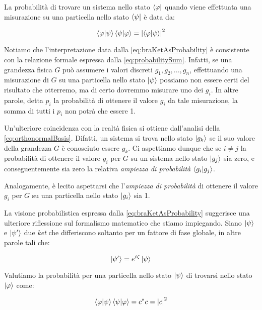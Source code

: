 La probabilità di trovare un sistema nello stato $\bra{\varphi}$ quando viene effettuata una misurazione su una particella nello stato $\bra{\psi}$ \`e data da:

	\begin{equation} \label{eq:braKetAsProbability}
		\braket{\varphi}{\psi} \braket{\psi}{\varphi} = \left | \braket{\varphi}{\psi} \right |^2
	\end{equation}

Notiamo che l'interpretazione data dalla \eqref{eq:braKetAsProbability} \`e consistente con la relazione formale espressa dalla \eqref{eq:probabilitySum}. Infatti, se una grandezza fisica $G$ può assumere i valori discreti $g_1, g_2, ..., g_n$, effettuando una misurazione di $G$ su una particella nello stato $\ket{\psi}$ possiamo non essere certi del risultato che otterremo, ma di certo dovremmo misurare uno dei $g_i$. In altre parole, detta $p_i$ la probabilità di ottenere il valore $g_i$ da tale misurazione, la somma di tutti i $p_i$ non potrà che essere 1.

Un'ulteriore coincidenza con la realtà fisica si ottiene dall'analisi della \eqref{eq:orthonormalBasis}. Difatti, un sistema si trova nello stato $\ket{g_k}$ se il suo valore della grandezza $G$ \`e conosciuto essere $g_k$. Ci aspettiamo dunque che se $i \neq j$ la probabilità di ottenere il valore $g_i$ per $G$ su un sistema nello stato $\ket{g_j}$ sia zero, e conseguentemente sia zero la relativa \textit{ampiezza di probabilità} $\braket{g_i}{g_j}$.

Analogamente, \`e lecito aspettarsi che l'\textit{ampiezza di probabilità} di ottenere il valore $g_i$ per $G$ su una particella nello stato $\ket{g_i}$ sia 1. 

La visione probabilistica espressa dalla \eqref{eq:braKetAsProbability} suggerisce una ulteriore riflessione sul formalismo matematico che stiamo impiegando. Siano $\ket{\psi}$ e $\ket{\psi ' }$ due \textit{ket} che differiscono soltanto per un fattore di fase globale, in altre parole tali che:

	\begin{equation}
		\ket{\psi '} = e^{i \zeta} \ket{\psi}
	\end{equation}

Valutiamo la probabilit\`a per una particella nello stato $\ket{\psi}$ di trovarsi nello stato $\ket{\varphi}$ come:

	\begin{equation}
		\braket{\varphi}{\psi} \braket{\psi}{\varphi} = c^* c = \left | c \right | ^ 2
	\end{equation}

